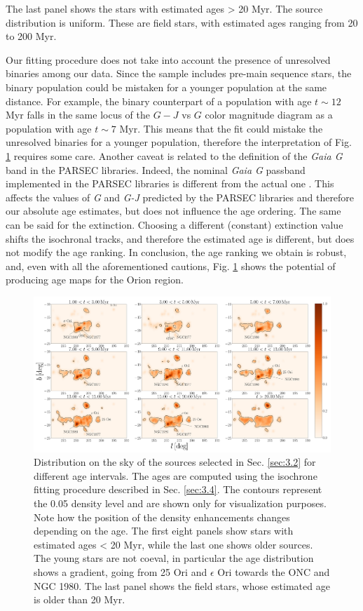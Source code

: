 \documentclass[onecolumn]{aa} %
\begin{document}
\begin{itemize}
\end{itemize}
The last panel shows the stars with estimated ages > 20 Myr. The source distribution is uniform. These are field stars, with estimated ages ranging from 20 to 200 Myr. 

Our fitting procedure does not take into account the presence of unresolved binaries among our data. Since the sample includes pre-main sequence stars, the binary population could be mistaken for a younger population at the same distance. For example, the binary counterpart of a population with age $t \sim 12 $ Myr falls in the same locus of the $G-J$ vs $G$ color magnitude diagram as a population with age $t \sim 7$  Myr. This means that the fit could mistake the unresolved binaries for a younger population, therefore the interpretation of Fig. \ref{fig:9} requires some care. 
Another caveat is related to the definition of the \textit{Gaia G}  band in the PARSEC libraries. Indeed, the nominal \textit{Gaia G}  passband \citep{Jordi2010} implemented in the PARSEC libraries  is different from the actual one \citep[cfr. ][]{Carrasco2016}. This affects the values of \textit{G} and \textit{G-J} predicted by the PARSEC libraries and therefore our absolute age estimates, but does not influence the age ordering. 
The same can be said for the extinction. Choosing a different (constant) extinction value shifts the isochronal tracks, and therefore the estimated age is different, but does not modify the age ranking.
In conclusion, the age ranking we obtain is robust, and, even with all the aforementioned cautions, Fig. \ref{fig:9} shows the potential of producing age maps for the Orion region.


\begin{figure}
\includegraphics[width = \hsize]{fig11.pdf}
\caption{Distribution on the sky of the sources selected in Sec. \ref{sec:3.2} for different age intervals. The ages are computed using the isochrone fitting procedure described in Sec. \ref{sec:3.4}. The contours represent the 0.05 density level and are shown only for visualization purposes. Note how the position of the density enhancements changes depending on the age. The first eight panels show stars with estimated ages < 20 Myr, while the last one shows older sources. The young stars are not coeval, in particular the age distribution shows a gradient, going from 25 Ori and $\epsilon$ Ori towards the ONC and NGC 1980. The last panel shows the field stars, whose estimated age is older than 20 Myr.}
\label{fig:9}
\end{figure}
\end{document}

